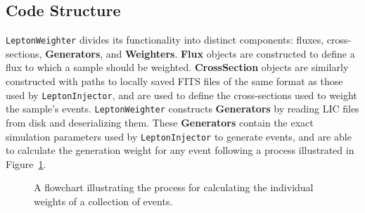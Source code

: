 \documentclass[main.tex]{subfiles}
\newcommand{\LeptonInjector}{\texttt{LeptonInjector}}
\newcommand{\LeptonWeighter}{\texttt{LeptonWeighter}}
\begin{document}
\subsection{Code Structure\label{sec:lw_code}}

\LeptonWeighter{} divides its functionality into distinct components: fluxes, cross-sections, \textbf{Generators}, and \textbf{Weighters}. 
\textbf{Flux} objects are constructed to define a flux to which a sample should be weighted.
\textbf{CrossSection} objects are similarly constructed with paths to locally saved FITS files of the same format as those used by \LeptonInjector{}, and are used to define the cross-sections used to weight the sample's events.
\LeptonWeighter{} constructs \textbf{Generators} by reading LIC files from disk and deserializing them.
These \textbf{Generators} contain the exact simulation parameters used by \LeptonInjector{} to generate events, and are able to calculate the generation weight for any event following a process illustrated in Figure~\ref{fig:LWflow}.

\begin{figure}[p]
    \centering
    \caption{A flowchart illustrating the process for calculating the individual weights of a collection of events.}
    \label{fig:LWflow}
\end{figure}
\end{document}

